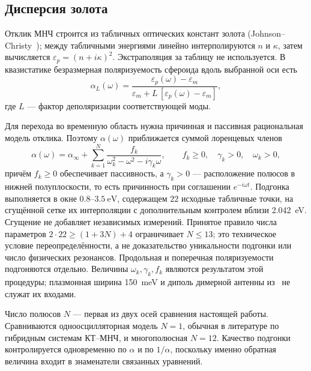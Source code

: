 \subsection{Дисперсия золота}
\label{sec:material}

Отклик МНЧ строится из табличных оптических констант золота
(Johnson--Christy~\cite{johnson1972}); между табличными энергиями линейно
интерполируются $n$ и $\kappa$, затем вычисляется
$\varepsilon_p=(n+i\kappa)^2$. Экстраполяция за таблицу не используется.
В квазистатике безразмерная поляризуемость сфероида вдоль
выбранной оси есть
\begin{equation}
  \alpha_L(\omega) =
  \frac{\varepsilon_p(\omega)-\varepsilon_m}
       {\varepsilon_m + L\,[\varepsilon_p(\omega)-\varepsilon_m]},
  \label{eq:alpha-L}
\end{equation}
где $L$ — фактор деполяризации соответствующей моды.

Для перехода во временную область нужна причинная и пассивная рациональная
модель отклика. Поэтому $\alpha(\omega)$ приближается суммой лоренцевых членов
\begin{equation}
  \alpha(\omega) = \alpha_\infty
  + \sum_{k=1}^{N} \frac{f_k}{\omega_k^2 - \omega^2 - i\gamma_k\omega},
  \qquad f_k \ge 0,\quad \gamma_k > 0,\quad \omega_k>0,
  \label{eq:lorentz-fit}
\end{equation}
причём $f_k\ge 0$ обеспечивает пассивность, а $\gamma_k>0$ — расположение
полюсов в нижней полуплоскости, то есть причинность при соглашении
$e^{-i\omega t}$. Подгонка выполняется в окне
$0.8$--$\SI{3.5}{\electronvolt}$, содержащем $22$ исходные табличные точки,
на сгущённой сетке их интерполяции с дополнительным контролем вблизи
\SI{2.042}{\electronvolt}. Сгущение не добавляет независимых измерений.
Принятое правило числа параметров $2\cdot22\ge (1+3N)+4$
ограничивает $N\le13$; это техническое условие переопределённости,
а не доказательство уникальности подгонки или число физических резонансов.
Продольная и поперечная поляризуемости подгоняются отдельно.
Величины $\omega_k,\gamma_k,f_k$ являются результатом этой процедуры;
плазмонная ширина \SI{150}{\milli\electronvolt} и диполь димерной
антенны из~\cite{shah2013} не служат их входами.

Число полюсов $N$ — первая из двух осей сравнения настоящей работы. Сравниваются
одноосцилляторная модель $N=1$, обычная в литературе по гибридным системам
КТ--МНЧ, и многополюсная $N=12$. Качество подгонки контролируется одновременно
по $\alpha$ и по $1/\alpha$, поскольку именно обратная величина входит в
знаменатели связанных уравнений.

